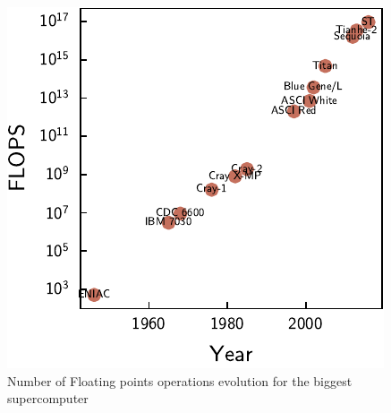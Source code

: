 \documentclass[ansiapaper]{report}
\begin{document}
\begin{multicols}{3}
  \begin{figure}[H]
    \centering
    \includegraphics[width=1\linewidth]{./figures/supercomputer_flops.pdf}
    \caption{Number of Floating points operations evolution for the biggest supercomputer \label{fig:supercomputer_flops}}
  \end{figure}

\end{multicols}
\end{document}
